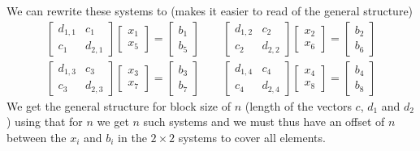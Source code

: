 \documentclass{article}
\begin{document}
\noindent We can rewrite these systems to (makes it easier to read of the general structure)
\begin{align*}
    \begin{bmatrix}
        d_{1,1} & c_{1} \\
        c_{1} & d_{2,1}
    \end{bmatrix} \begin{bmatrix}
        x_{1} \\ x_{5}
    \end{bmatrix} = \begin{bmatrix}
        b_{1} \\ b_{5}
    \end{bmatrix}
    \qquad \begin{bmatrix}
        d_{1,2} & c_{2} \\
        c_{2} & d_{2,2}
    \end{bmatrix}\begin{bmatrix}
        x_{2} \\ x_{6}
    \end{bmatrix} = \begin{bmatrix}
        b_{2} \\ b_{6}
    \end{bmatrix} \\[2mm]
    \begin{bmatrix}
        d_{1,3} & c_{3} \\
        c_{3} & d_{2,3}
    \end{bmatrix}\begin{bmatrix}
        x_{3} \\ x_{7}
    \end{bmatrix} = \begin{bmatrix}
        b_{3} \\ b_{7}
    \end{bmatrix} \qquad \begin{bmatrix}
        d_{1,4} & c_{4} \\
        c_{4} & d_{2,4}
    \end{bmatrix}\begin{bmatrix}
        x_{4} \\ x_{8} 
    \end{bmatrix} = \begin{bmatrix}
        b_{4} \\ b_{8}
    \end{bmatrix}
\end{align*}
\noindent We get the general structure for block size of $n$ (length of the vectors $c$, $d_{1}$ and $d_{2}$) using that for $n$ we get $n$ such systems and we must thus have an offset of $n$ between the $x_{i}$ and $b_{i}$ in the $2 \times 2$ systems to cover all elements.
\end{document}
